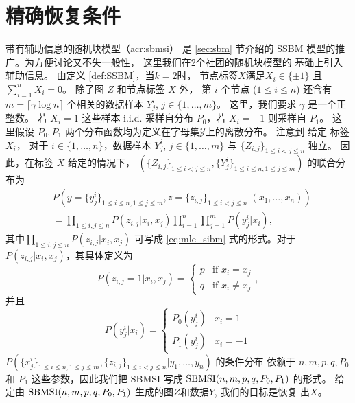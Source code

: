 \section{精确恢复条件}
\label{sec:sbmsi_exact_recovery_condtion}
带有辅助信息的随机块模型（\gls{acr:sbmsi}）
是 \ref{sec:sbm} 节介绍的
SSBM 模型的推广。为方便讨论又不失一般性，
这里我们在2个社团的随机块模型的
基础上引入辅助信息。
由定义 \ref{def:SSBM}，当$k=2$时，
节点标签$X$满足$X_i \in \{\pm 1\}$
且 $\sum_{i=1}^n X_i = 0$。
除了图 $Z$ 和节点标签 $X$ 外，
第 $i$  个节点 ($1\leq i \leq n$) 
还含有 $m=\lceil \gamma \log n \rceil $ 个相关的数据样本 
$Y^{i}_{j}$, $j\in \{1,\ldots,m\}$。
这里，我们要求 $\gamma$ 是一个正整数。
若 $X_i=1$
这些样本 i.i.d. 采样自分布 $P_0$，若  $X_i=-1$ 则采样自 $P_1$。
这里假设 $P_0, P_1$ 两个分布函数均为定义在字母集$\mathcal{Y}$上的离散分布。
注意到 给定 标签 $X_i$，
对于 $i\in\{1,\ldots,n\}$，数据样本 $Y^{i}_{j}$, $j\in \{1,\ldots,m\}$ 与 $\{Z_{i,j}\}_{1\le i<j\le n}$ 独立。
 因此，在标签 $X$ 给定的情况下，
  $(\{Z_{i,j}\}_{1\le i<j\le n},\{Y^i_{j}\}_{1\le i\le n,1\le j\le m})$ 的联合分布为  
\begin{align}\label{eq:lh}
    &P(y=\{y^i_{j}\}_{1\le i\le n,1\le j\le m},z=\{z_{i,j}\}_{1\le i<j\le n}| (x_1,\ldots,x_n)) \nonumber\\
    &= \prod_{1\le i,j\le n}P(z_{i,j}|x_i,x_j)\prod_{i=1}^n \prod_{j=1}^m P(y^i_j|x_i), 
\end{align}
其中$\prod_{1\le i,j\le n}P(z_{i,j}|x_i,x_j)$ 可写成
\eqref{eq:mle_sibm} 式的形式。对于$P(z_{i,j}|x_i,x_j)$，其具体定义为
\begin{equation*}
    P  (z_{i,j}=1|x_i,x_j) = \begin{cases}
        p & \text{if } x_i = x_j \\
        q & \text{if } x_i\ne x_j
    \end{cases},
\end{equation*}
并且
\begin{equation*}
    P(y^i_j|x_i) = \begin{cases}
        P_0(y^i_j) & x_i = 1 \\
        P_1(y^i_j) & x_i = -1
    \end{cases}
\end{equation*}
 $P(\{x^i_{j}\}_{1\le i\le n,1\le j\le m},\{z_{i,j}\}_{1\le i<j\le n}| y_1,\ldots,y_n)$ 
 的条件分布 依赖于
 $n,m,p, q, P_0$ 和 $P_1$ 这些参数，因此我们把 SBMSI 写成 $\operatorname{SBMSI}(n,m,p,q,P_0,P_1)$ 的形式。
 给定由 $\operatorname{SBMSI}(n,m,p,q,P_0,P_1)$ 生成的图$Z$和数据$Y$, 我们的目标是恢复 出$X$。
 
